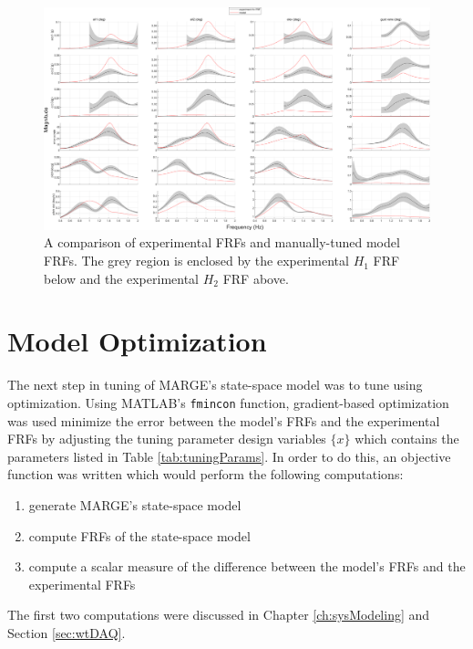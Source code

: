 \begin{landscape}

\begin{figure}[H]
	\centering
	\label{fig:manualTunedFRF}
	\includegraphics[width=9in]{figs/FRFcompare_manualTune_q207.png}
	\caption{A comparison of experimental FRFs and manually-tuned model FRFs. The grey region is enclosed by the experimental $H_1$ FRF below and the experimental $H_2$ FRF above.}
\end{figure}

\end{landscape}

\section{Model Optimization} %

The next step in tuning of MARGE's state-space model was to tune using optimization. Using MATLAB's \verb|fmincon| function, gradient-based optimization was used minimize the error between the model's FRFs and the experimental FRFs by adjusting the tuning parameter design variables $\{x\}$ which contains the parameters listed in Table \ref{tab:tuningParams}. In order to do this, an objective function was written which would perform the following computations:
\begin{enumerate}
	\item generate MARGE's state-space model
	\item compute FRFs of the state-space model
	\item compute a scalar measure of the difference between the model's FRFs and the experimental FRFs
\end{enumerate}
The first two computations were discussed in Chapter \ref{ch:sysModeling} and Section \ref{sec:wtDAQ}.

